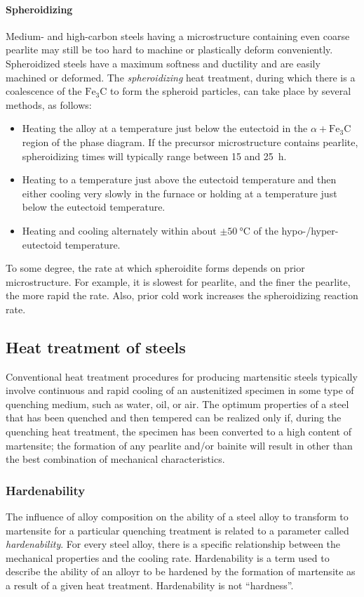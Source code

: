 \paragraph{Spheroidizing}
Medium- and high-carbon steels having a microstructure containing even coarse pearlite may still be too hard to machine or plastically deform conveniently. Spheroidized steels have a maximum softness and ductility and are easily machined or deformed. The \textit{spheroidizing} heat treatment, during which there is a coalescence of the $\mathrm{Fe}_3 \mathrm{C}$ to form the spheroid particles, can take place by several methods, as follows:
\begin{itemize}
  \item Heating the alloy at a temperature just below the eutectoid in the $\alpha + \mathrm{Fe}_3 \mathrm{C}$ region of the phase diagram. If the precursor microstructure contains pearlite, spheroidizing times will typically range between 15 and \qty{25}{h}.
  \item Heating to a temperature just above the eutectoid temperature and then either cooling very slowly in the furnace or holding at a temperature just below the eutectoid temperature.
  \item Heating and cooling alternately within about $\pm \qty{50}{\celsius}$ of the hypo-/hyper-eutectoid temperature.
\end{itemize}
To some degree, the rate at which spheroidite forms depends on prior microstructure.
For example, it is slowest for pearlite, and the finer the pearlite, the more rapid the
rate. Also, prior cold work increases the spheroidizing reaction rate.


\subsection{Heat treatment of steels}
Conventional heat treatment procedures for producing martensitic steels typically involve
continuous and rapid cooling of an austenitized specimen in some type of quenching
medium, such as water, oil, or air. The optimum properties of a steel that has been
quenched and then tempered can be realized only if, during the quenching heat treatment, the specimen has been converted to a high content of martensite; the formation of any
pearlite and/or bainite will result in other than the best combination of mechanical
characteristics.

\subsubsection{Hardenability}
The influence of alloy composition on the ability of a steel alloy to transform to martensite for a particular quenching treatment is related to a parameter called \textit{hardenability}. For every steel alloy, there is a specific relationship between the mechanical properties and the cooling rate. Hardenability is a term used to describe the ability of an alloyr to be hardened by the formation of martensite as a result of a given heat treatment. Hardenability is not ``hardness''. 

